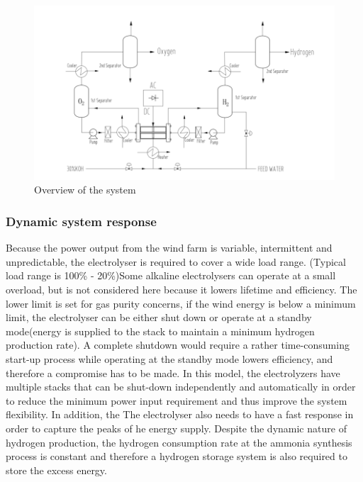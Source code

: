 \begin{figure}[H]
\centering
\includegraphics[width= 9 cm] {overview.png} 
\caption{Overview of the system} 
\end{figure}  



\subsubsection{Dynamic system response}
Because the power output from the wind farm is variable, intermittent and unpredictable, the electrolyser is required to cover a wide load range. (Typical load range is 100\% - 20\%)Some alkaline electrolysers can operate at a small overload, but is not considered here because it lowers lifetime and efficiency. The lower limit is set for gas purity concerns, if the wind energy is below a minimum limit, the electrolyser can be either shut down or operate at a standby mode(energy is supplied to the stack to maintain a minimum hydrogen production rate). A complete shutdown would require a rather time-consuming start-up process while operating at the standby mode lowers efficiency, and therefore a compromise has to be made. In this model, the electrolyzers have multiple stacks that can be shut-down independently and automatically in order to reduce the minimum power input requirement and thus improve the system flexibility.  In addition, the The electrolyser also needs to have a fast response in order to capture the peaks of he energy supply. Despite the dynamic nature of hydrogen production, the hydrogen consumption rate at the ammonia synthesis process is constant and therefore a hydrogen storage system is also required to store the excess energy. \cite{purity}\cite{gas} 
